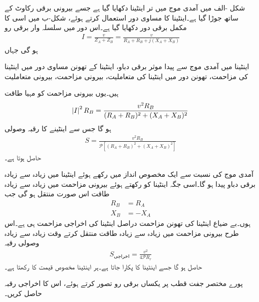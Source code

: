 شکل -الف میں آمدی موج میں تر اینٹینا دکھایا گیا ہے جسے بیرونی برقی رکاوٹ  کے ساتھ جوڑا گیا ہے۔اینٹینا کا  مساوی دور استعمال کرتے ہوئے،  شکل-ب میں اسی کا  مکمل برقی دور دکھایا گیا ہے۔اس دور میں سلسلہ وار برقی رو
\begin{align*}
I=\frac{v}{Z_A+Z_B}=\frac{v}{R_A+R_B+j(X_A+X_B)}
\end{align*}
ہو گی جہاں
\begin{description}
 اینٹینا میں آمدی موج سے پیدا موثر برقی دباو،
 اینٹینا کے تھونن مساوی دور میں اینٹینا کی مزاحمت،
 تھونن دور میں اینٹینا کی متعاملیت،
 بیرونی مزاحمت،
 بیرونی متعاملیت
\end{description}
ہیں۔یوں بیرونی مزاحمت کو مہیا طاقت 
\begin{align}
\abs{I}^2 R_B=\frac{v^2 R_B}{(R_A+R_B)^2+(X_A+X_B)^2}
\end{align}
ہو گا جس سے  اینٹینے کا رقبہ وصولی
\begin{align}
S=\frac{v^2 R_B}{\mathscr{P}\left[(R_A+R_B)^2+(X_A+X_B)^2\right]}
\end{align}
حاصل ہوتا ہے۔ 

آمدی موج کی نسبت سے ایک مخصوص انداز میں رکھے ہوئے اینٹینا میں زیادہ سے زیادہ برقی دباو پیدا ہو گا۔اسی جگہ اینٹینا کو رکھتے ہوئے بیرونی مزاحمت میں زیادہ سے زیادہ طاقت اس صورت منتقل ہو گی جب
\begin{align}
R_B&=R_A\\
X_B&=-X_A
\end{align}
ہوں۔بے ضیاع اینٹینا کی تھونن مزاحمت دراصل اینٹینا کی اخراجی مزاحمت  ہی ہے۔اس طرح بیرونی مزاحمت میں زیادہ سے زیادہ طاقت منتقل کرتے وقت زیادہ سے زیادہ وصولی رقبہ
\begin{align}\label{مساوات_اینٹینا_اخراجی_رقبہ_اینٹینا}
S_{\text{اخراجی}} = \frac{v^2}{4\mathscr{P} R_r }
\end{align}
 حاصل ہو گا جسے اینٹینا کا   پکارا جاتا ہے۔ہر اینٹینا مخصوص قیمت کا  رکھتا ہے۔

پورے مختصر جفت قطب پر یکساں برقی رو تصور کرتے ہوئے، اس کا اخراجی رقبہ حاصل کریں۔

